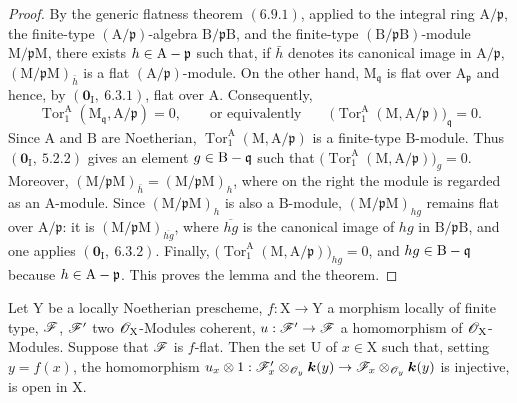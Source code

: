 \begin{proof}

By the generic flatness theorem $(6.9.1)$, applied to the integral ring
$\mathrm{A}/\mathfrak{p}$, the finite-type
$(\mathrm{A}/\mathfrak{p})$-algebra
$\mathrm{B}/\mathfrak{p}\mathrm{B}$, and the finite-type
$(\mathrm{B}/\mathfrak{p}\mathrm{B})$-module
$\mathrm{M}/\mathfrak{p}\mathrm{M}$, there exists
$h\in\mathrm{A}-\mathfrak{p}$ such that, if $\bar h$ denotes its canonical
image in $\mathrm{A}/\mathfrak{p}$,
$(\mathrm{M}/\mathfrak{p}\mathrm{M})_{\bar h}$ is a flat
$(\mathrm{A}/\mathfrak{p})$-module. On the other hand,
$\mathrm{M}_{\mathfrak q}$ is flat over $\mathrm{A}_{\mathfrak p}$ and
hence, by $(\mathbf{0}_\mathrm{I},~6.3.1)$, flat over $\mathrm{A}$.
Consequently,
\[
  \operatorname{Tor}_1^\mathrm{A}
  (\mathrm{M}_{\mathfrak q},\mathrm{A}/\mathfrak p)=0,
  \qquad\text{or equivalently}\qquad
  \bigl(\operatorname{Tor}_1^\mathrm{A}
  (\mathrm{M},\mathrm{A}/\mathfrak p)\bigr)_{\mathfrak q}=0.
\]
Since $\mathrm{A}$ and $\mathrm{B}$ are Noetherian,
$\operatorname{Tor}_1^\mathrm{A}
(\mathrm{M},\mathrm{A}/\mathfrak p)$ is a finite-type
$\mathrm{B}$-module. Thus $(\mathbf{0}_\mathrm{I},~5.2.2)$ gives an element
$g\in\mathrm{B}-\mathfrak q$ such that $\bigl(\operatorname{Tor}_1^\mathrm{A}
(\mathrm{M},\mathrm{A}/\mathfrak p)\bigr)_g=0$.
Moreover,
$(\mathrm{M}/\mathfrak p\mathrm{M})_{\bar h}
=(\mathrm{M}/\mathfrak p\mathrm{M})_h$, where on the right the module is
regarded as an $\mathrm{A}$-module. Since
$(\mathrm{M}/\mathfrak p\mathrm{M})_h$ is also a $\mathrm{B}$-module,
$(\mathrm{M}/\mathfrak p\mathrm{M})_{hg}$ remains flat over
$\mathrm{A}/\mathfrak p$: it is
$(\mathrm{M}/\mathfrak p\mathrm{M})_{\overline{hg}}$, where
$\overline{hg}$ is the canonical image of $hg$ in
$\mathrm{B}/\mathfrak p\mathrm{B}$, and one applies
$(\mathbf{0}_\mathrm{I},~6.3.2)$. Finally, $\bigl(\operatorname{Tor}_1^\mathrm{A}
(\mathrm{M},\mathrm{A}/\mathfrak p)\bigr)_{hg}=0$,
and $hg\in\mathrm{B}-\mathfrak q$ because
$h\in\mathrm{A}-\mathfrak p$. This proves the lemma and the theorem.
\end{proof}

\begin{corollary}[11.1.2]
\label{IV.11.1.2}
Let $\mathrm{Y}$ be a locally Noetherian prescheme, $f:\mathrm{X}\to\mathrm{Y}$ a morphism locally of finite type, $\mathscr{F}$, $\mathscr{F}'$ two $\mathscr{O}_\mathrm{X}$-Modules coherent, $u:\mathscr{F}'\to\mathscr{F}$ a homomorphism of $\mathscr{O}_\mathrm{X}$-Modules. Suppose that $\mathscr{F}$ is $f$-flat. Then the set $\mathrm{U}$ of $x\in\mathrm{X}$ such that, setting $y=f(x)$, the homomorphism $u_x\otimes 1:\mathscr{F}'_x\otimes_{\mathscr{O}_y}\boldsymbol{k}(y)\to\mathscr{F}_x\otimes_{\mathscr{O}_y}\boldsymbol{k}(y)$ is injective, is open in $\mathrm{X}$.
\end{corollary}

